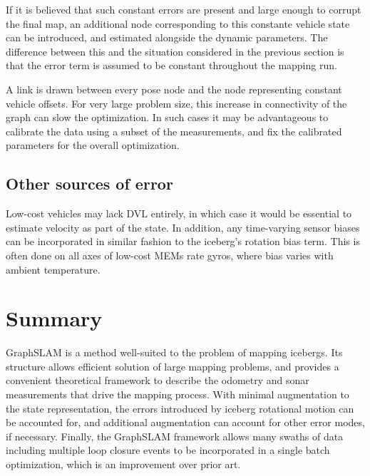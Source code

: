 If it is believed that such constant errors are present and large enough to corrupt the final map, an additional node corresponding to this constante vehicle state can be introduced, and estimated alongside the dynamic parameters. The difference between this and the situation considered in the previous section is that the error term is assumed to be constant throughout the mapping run. 

A link is drawn between every pose node and the node representing constant vehicle offsets. For very large problem size, this increase in connectivity of the graph can slow the optimization. In such cases it may be advantageous to calibrate the data using a subset of the measurements, and fix the calibrated parameters for the overall optimization. 

\subsection{Other sources of error}

Low-cost vehicles may lack DVL entirely, in which case it would be essential to estimate velocity as part of the state. In addition, any time-varying sensor biases can be incorporated in similar fashion to the iceberg's rotation bias term. This is often done on all axes of low-cost MEMs rate gyros, where bias varies with ambient temperature. 

\label{sec.DesignConsiderations}

\section{Summary}

GraphSLAM is a method well-suited to the problem of mapping icebergs. Its structure allows efficient solution of large mapping problems, and provides a convenient theoretical framework to describe the odometry and sonar measurements that drive the mapping process. With minimal augmentation to the state representation, the errors introduced by iceberg rotational motion can be accounted for, and additional augmentation can account for other error modes, if necessary. Finally, the GraphSLAM framework allows many swaths of data including multiple loop closure events to be incorporated in a single batch optimization, which is an improvement over prior art.